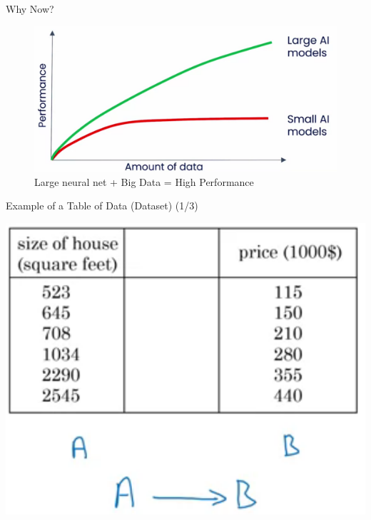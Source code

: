 \documentclass[pdf]{beamer}
\theoremstyle{mystyle}
\begin{document}
\begin{frame}{Why Now?}
	\begin{figure}[!ht]
		\centering
		\includegraphics[scale=.2]{images/big-data}
		\caption{Large neural net + Big Data = High Performance \citep{ng2023generative}}
		\label{fig:big-data}
	\end{figure}
\end{frame}

\begin{frame}{Example of a Table of Data (Dataset) (1/3)}
	\begin{table}[!ht]
		\centering
		\includegraphics[scale=.3]{example-dataset-2}
		\caption{House prices dataset~\citep{ng2019AIForEveryone}}
		\label{fig:example-dataset-2}
	\end{table}
\end{frame}
\end{document}
